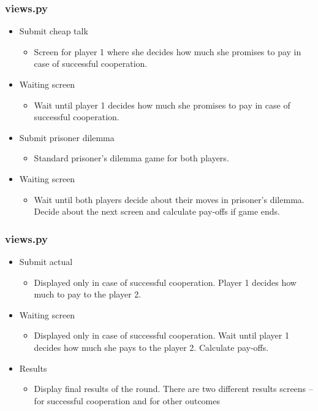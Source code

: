 \documentclass{beamer}
\begin{document}
\begin{frame}
\frametitle{views.py} 

\begin{itemize}
  \item Submit cheap talk
	\begin{itemize}
		\item Screen for player 1 where she decides how much she promises to pay in case of successful cooperation.
	\end{itemize}
  
	\item Waiting screen
	\begin{itemize}
		\item Wait until player 1 decides how much she promises to pay in case of successful cooperation. 
	\end{itemize}
	
	\item Submit prisoner dilemma
	\begin{itemize}
		\item Standard prisoner's dilemma game for both players.
	\end{itemize}
	
	\item Waiting screen
	\begin{itemize}
		\item Wait until both players decide about their moves in prisoner's dilemma. Decide about the next screen and calculate pay-offs if game ends.
	\end{itemize}

\end{itemize}
\end{frame}


\begin{frame}
\frametitle{views.py} 

\begin{itemize}  
	\item Submit actual
	\begin{itemize}
		\item Displayed only in case of successful cooperation. Player 1 decides how much to pay to the player 2.
	\end{itemize}
	
	\item Waiting screen
	\begin{itemize}
		\item Displayed only in case of successful cooperation. Wait until player 1 decides how much she pays to the player 2. Calculate pay-offs.
	\end{itemize}
	
	\item Results
	\begin{itemize}
		\item Display final results of the round. There are two different results screens -- for successful cooperation and for other outcomes
	\end{itemize}	

\end{itemize}
\end{frame}
\end{document}
